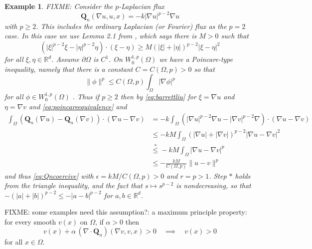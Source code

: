 \documentclass[final,leqno,onefignum,onetabnum]{siamltex1213bueler}
\newtheorem{example}{Example}
\newcommand\bQ{\mathbf{Q}}
\newcommand{\Div}{\nabla\cdot}
\newcommand\eps{\epsilon}
\renewcommand{\grad}{\nabla}
\newcommand\RR{\mathbb{R}}
\begin{document}
\begin{example} FIXME: Consider the $p$-Laplacian flux
\begin{equation}
  \bQ_n(\grad u,u,x) = - k |\grad u|^{p-2} \grad u
\end{equation}
with $p\ge 2$.  This includes the ordinary Laplacian (or Fourier) flux as the $p=2$ case.  In this case we use Lemma 2.1 from \cite{BarrettLiu1993}, which says there is $M>0$ such that
\begin{equation}
    (|\xi|^{p-2}\xi - |\eta|^{p-2}\eta)\cdot (\xi - \eta) \ge M \left(|\xi|+|\eta|\right)^{p-2} |\xi-\eta|^2  \label{eq:barrettliu}
\end{equation}
for all $\xi,\eta\in\RR^d$.  Assume $\partial \Omega$ is $C^1$.  On $W_0^{1,p}(\Omega)$ we have a Poincare-type inequality, namely  that there is a constant $C = C(\Omega,p)>0$ so that
\begin{equation}
  \|\phi\|^p \le C(\Omega,p) \int_\Omega |\grad \phi|^p  \label{eq:poincareequivalence}
\end{equation}
for all $\phi\in W_0^{1,p}(\Omega)$ \cite[theorem 5.6.3]{Evans}.  Thus if $p\ge 2$ then by \eqref{eq:barrettliu} for $\xi = \grad u$ and $\eta = \grad v$ and \eqref{eq:poincareequivalence} and
\begin{align*}
\int_\Omega \left(\bQ_n(\grad u) - \bQ_n(\grad v)\right)\cdot (\grad u - \grad v) &= -k  \int_\Omega \left(|\grad u|^{p-2} \grad u - |\grad v|^{p-2} \grad \right)\cdot (\grad u - \grad v) \\
  &\le - k M  \int_\Omega \left(|\grad u| + |\grad v|\right)^{p-2} |\grad u - \grad v|^2 \\
  &\stackrel{\ast}{\le} - k M  \int_\Omega |\grad u - \grad v|^p \\
  &\le - \frac{k M}{C(\Omega,p)} \|u-v\|^p
\end{align*}
and thus \eqref{eq:Qncoercive} with $\eps = kM/C(\Omega,p) > 0$ and $r=p>1$.  Step $\ast$ holds from the triangle inequality, and the fact that $s\mapsto s^{p-2}$ is nondecreasing, so that $-(|a| + |b|)^{p-2} \le - |a-b|^{p-2}$ for $a,b\in\RR^d$.
\end{example}

FIXME: some examples need this assumption?: a maximum principle property: for every smooth $v(x)$ on $\Omega$, if $\alpha>0$ then
\begin{equation}
v(x) + \alpha\, (\Div \bQ_n)(\grad v,v,x) > 0 \quad \implies \quad v(x) > 0 \label{eq:maxprincQn}
\end{equation}
for all $x\in\Omega$.
\end{document}

